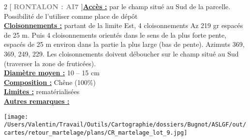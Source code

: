 \documentclass[a4paper,openany]{book}\usepackage[]{graphicx}\usepackage[]{color}
\begin{document}
\begin{multicols}{2}
[
\textbf{\textcolor{gray}{
\large RONTALON : AI7
}}
]\noindent\textbf{\underline{Accès :}} par le champ situé au Sud de la parcelle. Possibilité de l'utiliser comme place de dépôt\vspace{0.1cm} \\\noindent\textbf{\underline{Cloisonnements :}} partant de la limite Est, 4 cloisonnements Az 219 gr espacés de 25 m. Puis 4 cloisonnements orientés dans le sens de la plus forte pente, espacés de 25 m environ dans la partie la plus large (bas de pente). Azimuts 369, 369, 249, 229. Les cloisonnements doivent déboucher sur le champ situé au Sud (traverser la zone de fruticées).\vspace{0.1cm} \\\noindent\textbf{\underline{Diamètre moyen :}} 10 -- 15 cm\vspace{0.1cm} \\\noindent\textbf{\underline{Composition :}} Chêne (100\%)\vspace{0.1cm} \\\noindent\textbf{\underline{Limites :}} rematérialisées\vspace{0.1cm} \\\noindent\textbf{\underline{Autres remarques :}} \vspace{0.1cm} \\\end{multicols}\begin{center}
\texttt{[image: /Users/Valentin/Travail/Outils/Cartographie/dossiers/Bugnot/ASLGF/out/cartes/retour\_martelage/plans/CR\_martelage\_lot\_9.jpg]}
\end{center}\newpage\noindent
\end{document}
